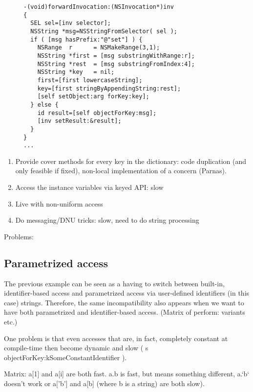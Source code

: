 \documentclass[preprint]{sigplanconf}
\begin{document}
\begin{figure}[htbp]
\begin{lstlisting}[style=numbers,label=compatibility3,caption=Compatibility via forwardInvocation.]
-(void)forwardInvocation:(NSInvocation*)inv
{
  SEL sel=[inv selector];
  NSString *msg=NSStringFromSelector( sel );
  if ( [msg hasPrefix:"@"set"] ) {
    NSRange  r      = NSMakeRange(3,1);
    NSString *first = [msg substringWithRange:r];
    NSString *rest  = [msg substringFromIndex:4];
    NSString *key   = nil;
    first=[first lowercaseString];
    key=[first stringByAppendingString:rest];
    [self setObject:arg forKey:key];
  } else {
    id result=[self objectForKey:msg];
    [inv setResult:&result];
  }
}
...
\end{lstlisting}
\end{figure}



\begin{enumerate}
\item Provide cover methods for every key in the dictionary:  code duplication (and only feasible if fixed),
	non-local implementation of a concern (Parnas).  
\item Access the instance variables via keyed API:  slow
\item Live with non-uniform access
\item Do messaging/DNU tricks:  slow, need to do string processing
\end{enumerate}

Problems:


\subsection{Parametrized access}

The previous example can be seen as a having to switch between built-in, identifier-based access and parametrized access via
user-defined identifiers (in this case) strings.  Therefore, the same incompatibility also appears when we want to have both
parametrized and identifier-based access.    (Matrix of  perform:  variants etc.)

One problem is that even accesses that are, in fact, completely constant at compile-time then become dynamic and slow
( s objectForKey:kSomeConstantIdentifier ).

Matrix:      a[1] and a[i]  are both fast.   a.b is fast, but means something different, a.`b` doesn't work or a['b'] and a[b] (where b is a string) are both slow).
\end{document}
